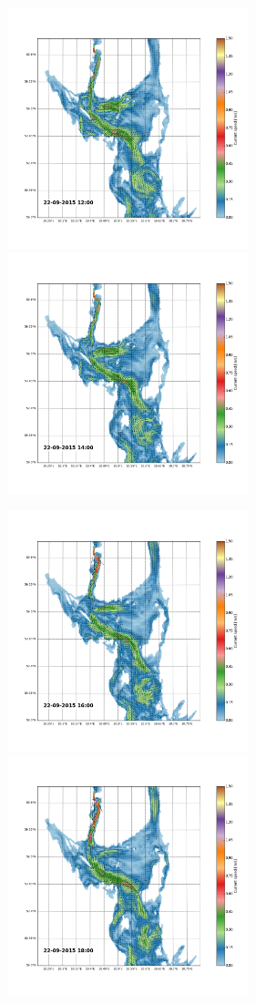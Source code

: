 \documentclass[12pt,a4paper,english]{article}
\begin{document}
\begin{figure}[ht]
\centerline{
\includegraphics*[trim=2.0cm 3cm 6.0cm 3.5cm,clip=true,height=7cm]{Python/stromfelt_94}
\includegraphics*[trim=3.7cm 3cm 1.3cm 3.5cm,clip=true,height=7cm]{Python/stromfelt_96}
}
\centerline{
\includegraphics*[trim=2.0cm 3cm 6.0cm 3.5cm,clip=true,height=7cm]{Python/stromfelt_98}
\includegraphics*[trim=3.7cm 3cm 1.3cm 3.5cm,clip=true,height=7cm]{Python/stromfelt_100}
}
\end{figure}
\end{document}
